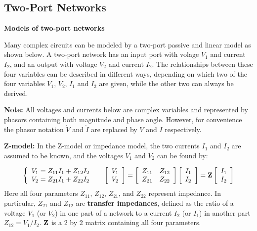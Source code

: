 \subsection*{Two-Port Networks}

{\bf Models of two-port networks}

Many complex circuits can be modeled by a two-port passive and linear model
as shown below. A two-port network has an input port with volage $V_1$ and
current $I_2$, and an output with voltage $V_2$ and current $I_2$. The
relationships between these four variables can be described in different 
ways, depending on which two of the four variables $V_1$, $V_2$, $I_1$ and 
$I_2$ are given, while the other two can always be derived.

{\bf Note: } All voltages and currents below are complex variables and
represented by phasors containing both magnitude and phase angle. However, 
for convenience the phasor notation $\dot{V}$ and $\dot{I}$ are replaced by 
$V$ and $I$ respectively.


{\bf Z-model:} In the Z-model or impedance model, the two currents $I_1$ 
and $I_2$ are assumed to be known, and the voltages $V_1$ and $V_2$ can be 
found by:

\[ \left\{ \begin{array}{l} V_1=Z_{11}I_1+Z_{12}I_2 \\
	V_2=Z_{21}I_1+Z_{22}I_2 \end{array} \right.\;\;\;\;\;
	\left[ \begin{array}{l} V_1 \\ V_2\end{array} \right]=
	\left[ \begin{array}{ll} Z_{11} & Z_{12}\\Z_{21} & Z_{22}\end{array}\right]
	\left[ \begin{array}{l} I_1 \\ I_2\end{array} \right]
	={\bf Z}\left[ \begin{array}{l} I_1 \\ I_2\end{array} \right]
\]
Here all four parameters $Z_{11}$, $Z_{12}$, $Z_{21}$, and $Z_{22}$ represent
impedance. In particular, $Z_{21}$ and $Z_{12}$ are {\bf transfer impedances}, 
defined as the ratio of a voltage $V_1$ (or $V_2$) in one part of a network to 
a current $I_2$ (or $I_1$) in another part $Z_{12}=V_1/I_2$. ${\bf Z}$ is a 2 
by 2 matrix containing all four parameters.


